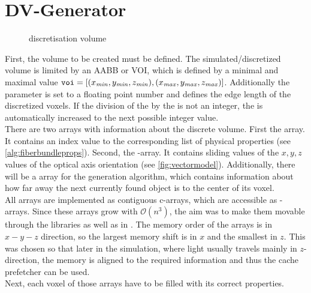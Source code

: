 \section{DV-Generator}
\label{sec:dv_generator}
% 
\begin{figure}[!t]
\centering
\setlength{\tikzwidth}{0.5\textwidth}
\caption{discretisation volume}
\label{fig:discVol}
\end{figure}
% 
First, the volume to be created must be defined.
The simulated/discretized volume is limited by an \ac{AABB} or \ac{VOI}, which is defined by a minimal and maximal value $\texttt{voi} = [(x_{\mathit{min}}, y_{\mathit{min}}, z_{\mathit{min}}),(x_{\mathit{max}}, y_{\mathit{max}}, z_{\mathit{max}})]$.
Additionally the \voxelsize{} parameter is set to a floating point number and defines the edge length of the discretized voxels.
If the division of the \voi{} by the \voxelsize{} is not an integer, the \voi{} is automatically increased to the next possible integer value.
\\
% 
There are two arrays with information about the discrete volume.
First the \tissue array.
It contains an index value to the corresponding list of physical properties (see \cref{alg:fiberbundleprops}). 
Second, the \opticalaxis-array.
It contains sliding values of the $x,y,z$ values of the optical axis orientation (see \cref{fig:vectormodel}).
Additionally, there will be a  array for the generation algorithm, which contains information about how far away the next currently found object is to the center of its voxel.
\\
% 
All arrays are implemented as contiguous c-arrays, which are accessible as -arrays.
Since these arrays grow with $\mathcal{O}(n^3)$, the aim was to make them movable through the \cpp libraries as well as in \python.
The memory order of the arrays is in $x-y-z$ direction, so the largest memory shift is in $x$ and the smallest in $z$.
This was chosen so that later in the simulation, where light usually travels mainly in $z$-direction, the memory is aligned to the required information and thus the cache prefetcher can be used.
\\
% 
Next, each voxel of those arrays have to be filled with its correct properties.
\\[\baselineskip]
% 
